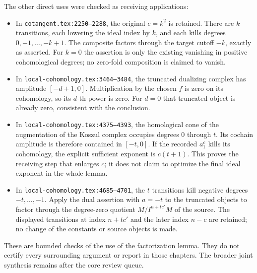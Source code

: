 The other direct uses were checked as receiving applications:\allowbreak{}

\begin{itemize}
\tightlist
\item
  In \texttt{cotangent.\allowbreak{}tex:\allowbreak{}2250–\allowbreak{}2288},\allowbreak{} the original \(c=k^2\) is retained. There are \(k\) transitions,\allowbreak{} each lowering the ideal index by \(k\),\allowbreak{} and each kills degrees \(0,-1,\ldots,-k+1\). The composite factors through the target cutoff \(-k\),\allowbreak{} exactly as asserted. For \(k=0\) the assertion is only the existing vanishing in positive cohomological degrees; no zero-fold composition is claimed to vanish.
\item
  In \texttt{local-\allowbreak{}cohomology.\allowbreak{}tex:\allowbreak{}3464–\allowbreak{}3484},\allowbreak{} the truncated dualizing complex has amplitude \([-d+1,0]\). Multiplication by the chosen \(f\) is zero on its cohomology,\allowbreak{} so its \(d\)-th power is zero. For \(d=0\) that truncated object is already zero,\allowbreak{} consistent with the conclusion.
\item
  In \texttt{local-\allowbreak{}cohomology.\allowbreak{}tex:\allowbreak{}4375–\allowbreak{}4393},\allowbreak{} the homological cone of the augmentation of the Koszul complex occupies degrees \(0\) through \(t\). Its cochain amplitude is therefore contained in \([-t,0]\). If the recorded \(a_1^c\) kills its cohomology,\allowbreak{} the explicit sufficient exponent is \(c(t+1)\). This proves the receiving step that enlarges \(c\); it does not claim to optimize the final ideal exponent in the whole lemma.
\item
  In \texttt{local-\allowbreak{}cohomology.\allowbreak{}tex:\allowbreak{}4685–\allowbreak{}4701},\allowbreak{} the \(t\) transitions kill negative degrees \(-t,\ldots,-1\). Apply the dual assertion with \(a=-t\) to the truncated objects to factor through the degree-zero quotient \(M/I^{n+tc'}M\) of the source. The displayed transitions at index \(n+tc'\) and the later index \(n-c\) are retained; no change of the constants or source objects is made.
\end{itemize}

These are bounded checks of the use of the factorization lemma. They do not certify every surrounding argument or report in those chapters. The broader joint synthesis remains after the core review queue.
